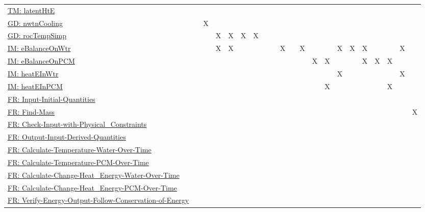 \documentclass[12pt]{article}
\begin{document}
\begin{longtable}{l l l l l l l l l l l l l l l l l l l l l}
\\
\hyperref[TM:latentHtE]{TM: latentHtE} &  &  &  &  &  &  &  &  &  &  &  &  &  &  &  &  &  &  &  & 
\\
\hyperref[GD:nwtnCooling]{GD: nwtnCooling} &  & X &  &  &  &  &  &  &  &  &  &  &  &  &  &  &  &  &  & 
\\
\hyperref[GD:rocTempSimp]{GD: rocTempSimp} &  &  & X & X & X & X &  &  &  &  &  &  &  &  &  &  &  &  &  & 
\\
\hyperref[IM:eBalanceOnWtr]{IM: eBalanceOnWtr} &  &  & X & X &  &  &  &  & X &  & X &  &  & X & X & X &  &  & X & 
\\
\hyperref[IM:eBalanceOnPCM]{IM: eBalanceOnPCM} &  &  &  &  &  &  &  &  &  &  &  & X & X &  &  & X & X & X &  & 
\\
\hyperref[IM:heatEInWtr]{IM: heatEInWtr} &  &  &  &  &  &  &  &  &  &  &  &  &  & X &  &  &  &  & X & 
\\
\hyperref[IM:heatEInPCM]{IM: heatEInPCM} &  &  &  &  &  &  &  &  &  &  &  &  & X &  &  &  &  & X &  & 
\\
\hyperref[inputInitQuants]{FR: Input-Initial-Quantities} &  &  &  &  &  &  &  &  &  &  &  &  &  &  &  &  &  &  &  & 
\\
\hyperref[findMass]{FR: Find-Mass} &  &  &  &  &  &  &  &  &  &  &  &  &  &  &  &  &  &  &  & X
\\
\hyperref[checkWithPhysConsts]{FR: Check-Input-with-Physical\_Constraints} &  &  &  &  &  &  &  &  &  &  &  &  &  &  &  &  &  &  &  & 
\\
\hyperref[outputInputDerivQuants]{FR: Output-Input-Derived-Quantities} &  &  &  &  &  &  &  &  &  &  &  &  &  &  &  &  &  &  &  & 
\\
\hyperref[calcTempWtrOverTime]{FR: Calculate-Temperature-Water-Over-Time} &  &  &  &  &  &  &  &  &  &  &  &  &  &  &  &  &  &  &  & 
\\
\hyperref[calcTempPCMOverTime]{FR: Calculate-Temperature-PCM-Over-Time} &  &  &  &  &  &  &  &  &  &  &  &  &  &  &  &  &  &  &  & 
\\
\hyperref[calcChgHeatEnergyWtrOverTime]{FR: Calculate-Change-Heat\_Energy-Water-Over-Time} &  &  &  &  &  &  &  &  &  &  &  &  &  &  &  &  &  &  &  & 
\\
\hyperref[calcChgHeatEnergyPCMOverTime]{FR: Calculate-Change-Heat\_Energy-PCM-Over-Time} &  &  &  &  &  &  &  &  &  &  &  &  &  &  &  &  &  &  &  & 
\\
\hyperref[verifyEnergyOutput]{FR: Verify-Energy-Output-Follow-Conservation-of-Energy} &  &  &  &  &  &  &  &  &  &  &  &  &  &  &  &  &  &  &  & 

\end{longtable}
\end{document}
